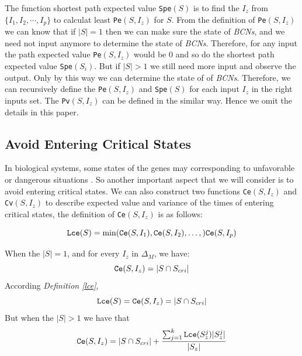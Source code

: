 The function shortest path  expected value {\tt Spe}$(S)$ is to find the $I_z$ from $\{I_1,I_2,\cdots, I_p\}$ to calculat least {\tt Pe}$(S, I_z)$ for $S$. From the definition of {\tt Pe}$(S, I_z)$ we can know that if $|S|=1$ then we can make sure the state of {\em BCNs}, and we need not input anymore to determine the state of {\em BCNs}. Therefore, for any input the path expected value {\tt Pe}$(S, I_z)$ would be $0$ and so do the shortest path  expected value {\tt Spe}$(S_i)$. But if $|S|>1$ we still need more input and observe the output. Only by this way we can determine the state of of {\em BCNs}. Therefore,  we can recursively define the {\tt Pe}$(S, I_z)$ and {\tt Spe}$(S)$ for each input $I_z$ in the right inputs set.  The {\tt Pv}$(S, I_z)$ can be defined in the similar way. Hence we omit the details in this paper. 

\subsection{Avoid Entering Critical States}
In biological systems, some states of the genes may corresponding to unfavorable or dangerous situations \cite{Li2014Controllability}. So another important aspect that we will consider is to avoid entering critical states. We can also construct two functions {\tt Ce}$(S, I_z)$ and {\tt Cv}$(S, I_z)$ to describe expected value and variance of the times of entering critical states, the definition of {\tt Ce}$(S, I_z)$ is as follows:\\
\begin{definition}[{\tt Lce}$(S)$] \label{lce}
\[{\tt Lce}(S)= \min({\tt Ce}(S, I_1),{\tt Ce}(S, I_2),\ldots,){\tt Ce}(S, I_p)\]
\end{definition}
\begin{definition}[{\tt Ce}$(S, I_z)$] 
When the $|S|=1$, and for every $I_z$ in $\Delta_M$, we have: \[{\tt Ce}(S, I_z)=|S \cap S_{cri} |\] 
According {\em Definition \ref{lce}}, %
\[{\tt Lce}(S)={\tt Ce}(S, I_z)=|S \cap S_{cri} |\] 
But when the $|S|>1$ 
we have that 
\[{\tt Ce}(S, I_z)=|S \cap S_{cri} | +\frac{\sum_{j=1}^k {\tt Lce}(S_z^j)|S_z^j|}{ |S_z|} \] 
\end{definition}

